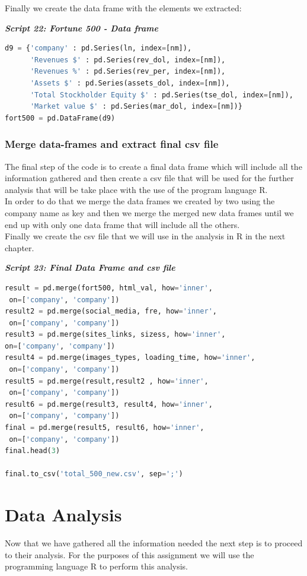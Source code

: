 \documentclass{article}
\begin{document}
Finally we create the data frame with the elements we extracted:
\begin{center}
\textit{\textbf{Script 22: Fortune 500 - Data frame}}
\end{center}
\begin{lstlisting}[language=Python]  
d9 = {'company' : pd.Series(ln, index=[nm]),
      'Revenues $' : pd.Series(rev_dol, index=[nm]),
      'Revenues %' : pd.Series(rev_per, index=[nm]),
      'Assets $' : pd.Series(assets_dol, index=[nm]),
      'Total Stockholder Equity $' : pd.Series(tse_dol, index=[nm]),
      'Market value $' : pd.Series(mar_dol, index=[nm])}
fort500 = pd.DataFrame(d9)    
\end{lstlisting}
\subsubsection{Merge data-frames and extract final csv file}
The final step of the code is to create a final data frame which will include all the information gathered and then create a csv file that will be used for the further analysis that will be take place with the use of the program language R.\\
In order to do that we merge the data frames we created by two using the company name as key and then we merge the merged new data frames until we end up with only one data frame that will include all the others.\\
Finally we create the csv file that we will use in the analysis in R in the next chapter.
\begin{center}
\textit{\textbf{Script 23: Final Data Frame and csv file}}
\end{center}
\begin{lstlisting}[language=Python]
result = pd.merge(fort500, html_val, how='inner',
 on=['company', 'company'])
result2 = pd.merge(social_media, fre, how='inner',
 on=['company', 'company'])
result3 = pd.merge(sites_links, sizess, how='inner', 
on=['company', 'company'])
result4 = pd.merge(images_types, loading_time, how='inner',
 on=['company', 'company'])
result5 = pd.merge(result,result2 , how='inner',
 on=['company', 'company'])
result6 = pd.merge(result3, result4, how='inner',
 on=['company', 'company'])
final = pd.merge(result5, result6, how='inner',
 on=['company', 'company'])
final.head(3)

final.to_csv('total_500_new.csv', sep=';')
\end{lstlisting}
\newpage  
\section{Data Analysis}
Now that we have gathered all the information needed the next step is to proceed to their analysis. For the purposes of this assignment we will use the programming language R to perform this analysis.
\end{document}

